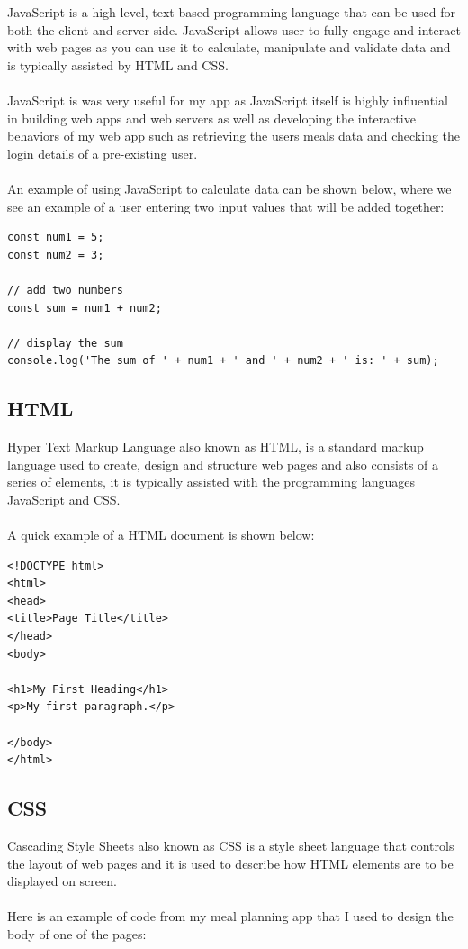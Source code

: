 JavaScript is a high-level, text-based programming language that can be used for both the client and server side. JavaScript allows user to fully engage and interact with web pages as you can use it to calculate, manipulate and validate data and is typically assisted by HTML and CSS.\\ \\
JavaScript is was very useful for my app as JavaScript itself is highly influential in building web apps and web servers as well as developing the interactive behaviors of my web app such as retrieving the users meals data and checking the login details of a pre-existing user.\\ \\
An example of using JavaScript to calculate data can be shown below, where we see an example of a user entering two input values that will be added together:
\begin{verbatim}
const num1 = 5;
const num2 = 3;

// add two numbers
const sum = num1 + num2;

// display the sum
console.log('The sum of ' + num1 + ' and ' + num2 + ' is: ' + sum);
\end{verbatim}

\subsection{HTML}

Hyper Text Markup Language also known as HTML, is a standard markup language used to create, design and structure web pages and also consists of a series of elements, it is typically assisted with the programming languages JavaScript and CSS.\\ \\
A quick example of a HTML document is shown below:

\begin{verbatim}
<!DOCTYPE html>
<html>
<head>
<title>Page Title</title>
</head>
<body>

<h1>My First Heading</h1>
<p>My first paragraph.</p>

</body>
</html>
\end{verbatim}

\subsection{CSS}

Cascading Style Sheets also known as CSS is a style sheet language that controls the layout of web pages and it is used to describe how HTML elements are to be displayed on screen.\\ \\
Here is an example of code from my meal planning app that I used to design the body of one of the pages:

